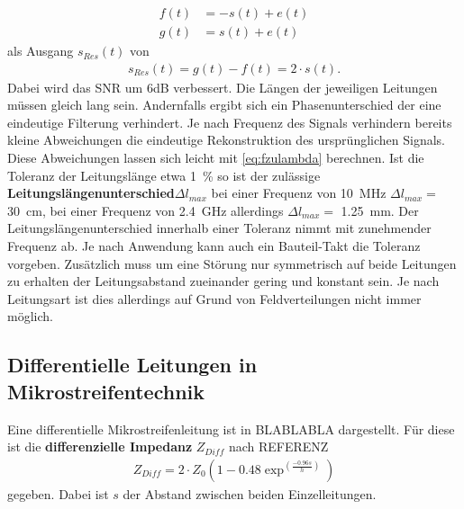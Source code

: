 \begin{align}
f(t) &= -s(t) + e(t) \\
g(t) &=  s(t) + e(t)
\end{align}
als Ausgang $s_{Res}(t)$ von
\begin{align}
s_{Res}(t) = g(t) - f(t)= 2\cdot s(t).
\end{align}
Dabei wird das SNR um 6dB verbessert. Die Längen der jeweiligen Leitungen müssen gleich lang sein. Andernfalls ergibt sich ein Phasenunterschied der eine eindeutige Filterung verhindert. Je nach Frequenz des Signals verhindern bereits kleine Abweichungen die eindeutige Rekonstruktion des ursprünglichen Signals. Diese Abweichungen lassen sich leicht mit \ref{eq:fzulambda} berechnen. Ist die Toleranz der Leitungslänge etwa \SI{1}{\percent} so ist der zulässige \textbf{Leitungslängenunterschied}$\Delta l_{max}$ bei einer Frequenz von \SI{10}{\mega\hertz} $\Delta l_{max} = $ \SI{30}{\centi\meter}, bei einer Frequenz von \SI{2.4}{\giga\hertz} allerdings $\Delta l_{max} =$ \SI{1.25}{\milli\meter}. Der  Leitungslängenunterschied innerhalb einer Toleranz nimmt mit zunehmender Frequenz ab. Je nach Anwendung kann auch ein Bauteil-Takt die Toleranz vorgeben. Zusätzlich muss um eine Störung nur symmetrisch auf beide Leitungen zu erhalten der Leitungsabstand zueinander gering und konstant sein. Je nach Leitungsart ist dies allerdings auf Grund von Feldverteilungen nicht immer möglich.
\subsection{Differentielle Leitungen in Mikrostreifentechnik}
Eine differentielle Mikrostreifenleitung ist in BLABLABLA dargestellt. Für diese ist die \textbf{differenzielle Impedanz} $Z_{Diff}$ nach REFERENZ
\begin{align}
Z_{Diff} = 2\cdot Z_{0} \left(1-0.48\exp^{\left(\frac{-0.96s}{h}\right)}\right)
\end{align} 
gegeben. Dabei ist $s$ der Abstand zwischen beiden Einzelleitungen.

